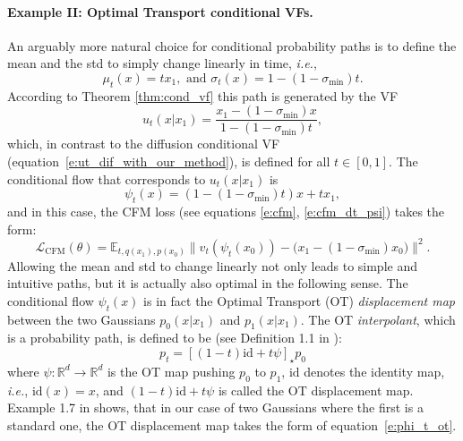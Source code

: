 \documentclass{article}
\makeatletter
\newcommand{\Real}{\mathbb R}
\newcommand{\too}{\rightarrow}
\newcommand{\CFM}{\scriptscriptstyle \text{CFM}}
\newcommand{\ie}{{i.e.}}
\def\eqref#1{equation~\ref{#1}}
\def\gL{{\mathcal{L}}}
\newcommand{\E}{\mathbb{E}}
\renewcommand*{\ie}{{\it i.e.}\@\xspace}
\newcommand{\sigmamin}{\sigma_{\text{min}}}
\makeatother
\begin{document}
\paragraph{Example II: Optimal Transport conditional VFs.}
An arguably more natural choice for conditional probability paths is to define the mean and the std to simply change linearly in time, \ie, 
\begin{equation}
    \mu_t(x) = tx_1, \text{ and } \sigma_t(x) = 1-(1-\sigmamin)t.
\end{equation}
According to Theorem \ref{thm:cond_vf} this path is generated by the VF
\begin{equation}\label{e:ut_ot}
    u_t(x|x_1)= \frac{x_1-(1-\sigmamin)x}{1-(1-\sigmamin)t},
\end{equation}
which, in contrast to the diffusion conditional VF (\eqref{e:ut_dif_with_our_method}), is defined for all $t\in[0,1]$. The conditional flow that corresponds to $u_t(x|x_1)$ is \begin{equation}\label{e:phi_t_ot}
    \psi_t(x) = (1-(1-\sigmamin)t)x + tx_1,
\end{equation}
and in this case, the CFM loss (see equations \ref{e:cfm}, \ref{e:cfm_dt_psi}) takes the form: 
\begin{equation}\label{e:cfm_cond_ot}
     \gL_{\CFM}(\theta) 
     =\E_{t, q(x_1), p(x_0)} \Big\|v_t(\psi_t(x_0)) - \Big (x_1 - (1-\sigma_{\min})x_0\Big) \Big\|^2.     
\end{equation}
%
Allowing the mean and std to change linearly not only leads to simple and intuitive paths, but it is actually also optimal in the following sense.
%
{The conditional flow $\psi_t(x)$} is in fact the Optimal Transport (OT) \emph{displacement map} between the two Gaussians $p_0(x|x_1)$ and $p_1(x|x_1)$. The OT \emph{interpolant}, which is a probability path, is defined to be (see Definition 1.1 in \cite{mccann1997convexity}):
\begin{equation}
    p_t = [(1-t)\mathrm{id} + t\psi]_\star p_0
\end{equation}
where $\psi:\Real^d\too\Real^d$ is the OT map pushing $p_0$ to $p_1$, $\mathrm{id}$ denotes the identity map, \ie, $\mathrm{id}(x)=x$, and $(1-t)\mathrm{id} + t\psi$ is called the OT displacement map. Example 1.7 in \cite{mccann1997convexity} shows,  that in our case of two Gaussians where the first is a standard one, the OT displacement map takes the form of \eqref{e:phi_t_ot}. 
\end{document}
